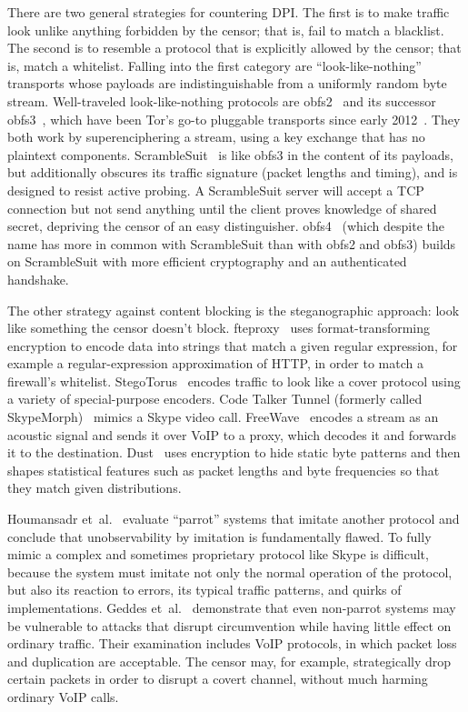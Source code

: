 \documentclass[conference]{IEEEtran}
\begin{document}
There are two general strategies for countering DPI.
The first is to make traffic look unlike
anything forbidden by the censor; that is, fail to match a blacklist. The second is
to resemble a protocol that is explicitly allowed by the censor; that is, match a whitelist.
Falling into the first category are ``look-like-nothing'' transports whose
payloads are indistinguishable from a uniformly random byte stream.
Well-traveled look-like-nothing
protocols are obfs2~\cite{obfs2} and its successor obfs3~\cite{obfs3},
which have been Tor's go-to pluggable transports since early 2012~\cite{obfsproxy-arms-race}.
They both work by superenciphering a stream, using a key exchange that has no plaintext components.
ScrambleSuit~\cite{scramblesuit} is like obfs3 in the
content of its payloads, but additionally obscures its traffic signature
(packet lengths and timing), and is designed to resist active probing.
A ScrambleSuit server will accept a TCP connection but not send anything
until the client proves knowledge of shared secret, depriving the censor
of an easy distinguisher.
obfs4~\cite{obfs4}
(which despite the name has more in common with ScrambleSuit than with obfs2 and obfs3)
builds on ScrambleSuit with more efficient cryptography and an authenticated handshake.

The other strategy against content blocking is the steganographic approach: look like
something the censor doesn't block.
fteproxy~\cite{fte} uses format-transforming encryption to encode data into strings
that match a given regular expression,
for example a regular-expression approximation of HTTP,
in order to match a firewall's whitelist.
StegoTorus~\cite{stegotorus}
encodes traffic to look like a cover protocol
using a variety of special-purpose encoders.
Code Talker
Tunnel (formerly called SkypeMorph)~\cite{skypemorph} mimics a Skype video call.
FreeWave~\cite{freewave} encodes a stream as an acoustic signal
and sends it over VoIP to a proxy, which decodes it and forwards it to the destination.
Dust~\cite{dust} uses encryption to hide static byte patterns and then
shapes statistical features such as packet lengths and byte frequencies so that they
match given distributions.

Houmansadr et~al.~\cite{parrot} evaluate ``parrot'' systems that imitate another protocol
and conclude that unobservability by imitation is fundamentally flawed.
To fully mimic a complex and sometimes proprietary protocol like Skype
is difficult,
because the system must imitate not only the normal operation of the protocol,
but also its reaction to errors,
its typical traffic patterns, and quirks of implementations.
Geddes et~al.~\cite{acks}
demonstrate that even non-parrot systems may be vulnerable to
attacks that disrupt circumvention while having little effect
on ordinary traffic.
Their examination includes VoIP protocols,
in which packet loss and duplication are acceptable.
The censor may, for example, strategically drop certain packets
in order to disrupt a covert channel, without much harming ordinary VoIP calls.
\end{document}
